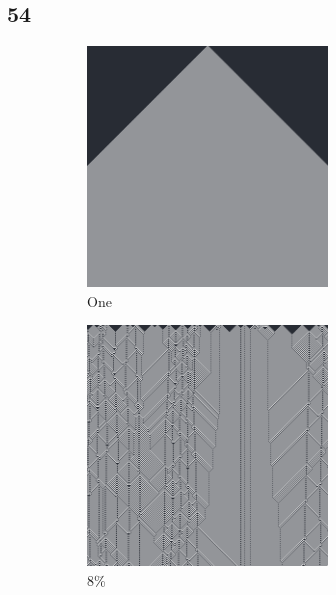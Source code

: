 \documentclass[12pt, fleqn]{report}                             %
\theoremstyle{break}                                            %
\begin{document}
        \subsection{54}
        \begin{figure}[h!]
          \centering
          \begin{subfigure}[b]{0.4\linewidth}
            \includegraphics[width=0.7\textwidth]{Images/54/a.png}
            \caption{One}
          \end{subfigure}
          \begin{subfigure}[b]{0.4\linewidth}
            \includegraphics[width=0.7\textwidth]{Images/54/b.png}
            \caption{8\%}
          \end{subfigure}
          \begin{subfigure}[b]{0.4\linewidth}

\end{subfigure}
\end{figure}
\end{document}
